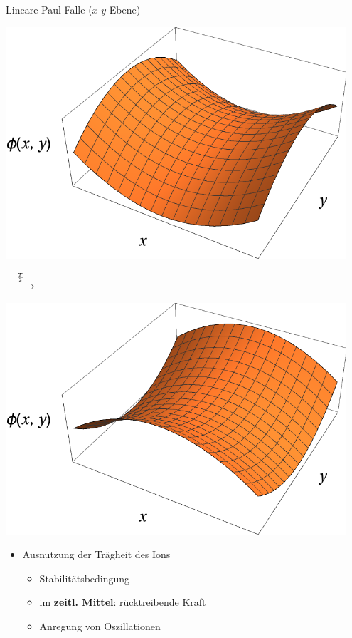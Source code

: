 \documentclass[12pt,xcolor=dvipsnames,professionalfonts]{beamer}
\begin{document}
\begin{frame}{Lineare Paul-Falle ($x$-$y$-Ebene)}
	\begin{minipage}[t]{0.45\textwidth}
		\centering
		\includegraphics[width=0.95\textwidth]{./figures/sattelpotential.pdf}
	\end{minipage}%
	\begin{minipage}[c]{0.1\textwidth}
		$\stackrel{\frac{T}{2}}{\xrightarrow{\hspace*{.8cm}}}$
	\end{minipage}%
	\begin{minipage}[t]{0.45\textwidth}
		\centering
		\includegraphics[width=0.95\textwidth]{./figures/sattelpotential2.pdf}
	\end{minipage}
	\vspace{0.3cm}
	\begin{itemize}
		\item Ausnutzung der Trägheit des Ions
		\begin{itemize}
			\item Stabilitätsbedingung
			\item im \textbf{zeitl. Mittel}: rücktreibende Kraft
			\item Anregung von Oszillationen
		\end{itemize}
	\end{itemize}
\end{frame}
\end{document}
